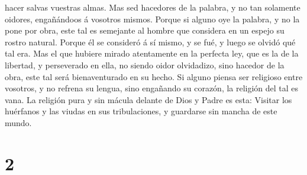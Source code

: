 hacer salvas vuestras almas.  Mas sed hacedores de la
palabra, y no tan solamente oidores, engañándoos á vosotros mismos.
 Porque si alguno oye la palabra, y no la pone por obra,
este tal es semejante al hombre que considera en un espejo su rostro
natural.  Porque él se consideró á sí mismo, y se fué, y
luego se olvidó qué tal era.  Mas el que hubiere mirado
atentamente en la perfecta ley, que es la de la libertad, y perseverado
en ella, no siendo oidor olvidadizo, sino hacedor de la obra, este tal
será bienaventurado en su hecho.  Si alguno piensa ser
religioso entre vosotros, y no refrena su lengua, sino engañando su
corazón, la religión del tal es vana.  La religión pura y
sin mácula delante de Dios y Padre es esta: Visitar los huérfanos y las
viudas en sus tribulaciones, y guardarse sin mancha de este mundo.

\hypertarget{section-1}{%
\section{2}\label{section-1}}

